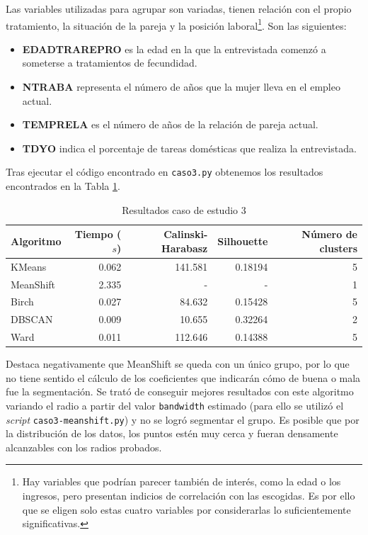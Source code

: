 \documentclass[a4paper, 20pt]{article}
\begin{document}
Las variables utilizadas para agrupar son variadas, tienen relación con el propio tratamiento, la situación de la pareja y la posición laboral\footnote{Hay variables que podrían parecer también de interés, como la edad o los ingresos, pero presentan indicios de correlación con las escogidas. Es por ello que se eligen solo estas cuatro variables por considerarlas lo suficientemente significativas.}. Son las siguientes:

\begin{itemize}
\item \textbf{EDADTRAREPRO} es la edad en la que la entrevistada comenzó a someterse a tratamientos de fecundidad.
\item \textbf{NTRABA} representa el número de años que la mujer lleva en el empleo actual.
\item \textbf{TEMPRELA} es el número de años de la relación de pareja actual.
\item \textbf{TDYO} indica el porcentaje de tareas domésticas que realiza la entrevistada.
\end{itemize}

Tras ejecutar el código encontrado en \texttt{caso3.py} obtenemos los resultados encontrados en la Tabla \ref{tab:algorithms3}.

\begin{table}[H]
\centering
\caption{Resultados caso de estudio 3}
\label{tab:algorithms3}
\begin{tabular}{lrrrr}
\toprule
Algoritmo & Tiempo ($s$) & Calinski-Harabasz & Silhouette & Número de clusters\\
\midrule
KMeans & 0.062 & 141.581 & 0.18194 & 5 \\
MeanShift & 2.335 & - & - & 1 \\
Birch & 0.027 & 84.632 & 0.15428 & 5 \\
DBSCAN & 0.009 & 10.655 & 0.32264 & 2 \\
Ward & 0.011 & 112.646 & 0.14388 & 5 \\
\bottomrule
\end{tabular}
\end{table}

Destaca negativamente que MeanShift se queda con un único grupo, por lo que no tiene sentido el cálculo de los coeficientes que indicarán cómo de buena o mala fue la segmentación. Se trató de conseguir mejores resultados con este algoritmo variando el radio a partir del valor \texttt{bandwidth} estimado (para ello se utilizó el \textit{script} \texttt{caso3-meanshift.py}) y no se logró segmentar el grupo. Es posible que por la distribución de los datos, los puntos estén muy cerca y fueran densamente alcanzables con los radios probados.
\end{document}
